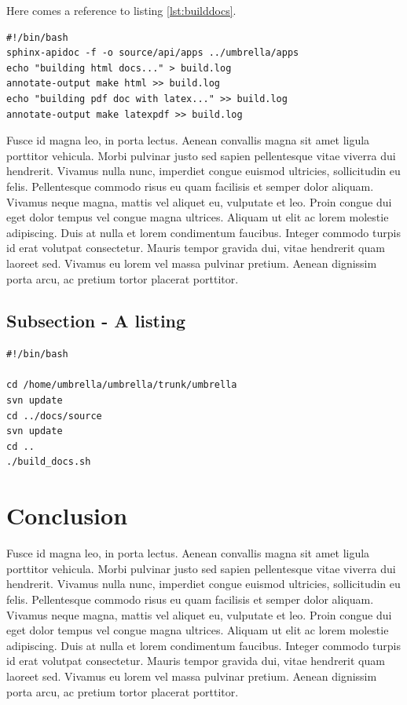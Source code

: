 Here comes a reference to listing \ref{lst:builddocs}.

\lstset{tabsize=2,language=bash}
\begin{lstlisting}[breaklines=true,frame=single,caption={Shellscript for building the software documentation in HTML and PDF},label=lst:builddocs]
#!/bin/bash
sphinx-apidoc -f -o source/api/apps ../umbrella/apps
echo "building html docs..." > build.log
annotate-output make html >> build.log
echo "building pdf doc with latex..." >> build.log
annotate-output make latexpdf >> build.log
\end{lstlisting}

Fusce id magna leo, in porta lectus. Aenean convallis magna sit amet ligula
porttitor vehicula. Morbi pulvinar justo sed sapien pellentesque vitae viverra
dui hendrerit. Vivamus nulla nunc, imperdiet congue euismod ultricies,
sollicitudin eu felis. Pellentesque commodo risus eu quam facilisis et semper
dolor aliquam. Vivamus neque magna, mattis vel aliquet eu, vulputate et leo.
Proin congue dui eget dolor tempus vel congue magna ultrices. Aliquam ut elit
ac lorem molestie adipiscing. Duis at nulla et lorem condimentum faucibus.
Integer commodo turpis id erat volutpat consectetur. Mauris tempor gravida
dui, vitae hendrerit quam laoreet sed. Vivamus eu lorem vel massa pulvinar
pretium. Aenean dignissim porta arcu, ac pretium tortor placerat porttitor. 


\subsection{Subsection - A listing}



\lstset{tabsize=2,language=bash}
\begin{lstlisting}[breaklines=true,frame=single,caption={Shellscript that handles the complete build process of the documentation},label=lst:cron-job]
#!/bin/bash

cd /home/umbrella/umbrella/trunk/umbrella
svn update
cd ../docs/source
svn update
cd ..
./build_docs.sh
\end{lstlisting}




\newpage
\section{Conclusion}
Fusce id magna leo, in porta lectus. Aenean convallis magna sit amet ligula
porttitor vehicula. Morbi pulvinar justo sed sapien pellentesque vitae viverra
dui hendrerit. Vivamus nulla nunc, imperdiet congue euismod ultricies,
sollicitudin eu felis. Pellentesque commodo risus eu quam facilisis et semper
dolor aliquam. Vivamus neque magna, mattis vel aliquet eu, vulputate et leo.
Proin congue dui eget dolor tempus vel congue magna ultrices. Aliquam ut elit
ac lorem molestie adipiscing. Duis at nulla et lorem condimentum faucibus.
Integer commodo turpis id erat volutpat consectetur. Mauris tempor gravida
dui, vitae hendrerit quam laoreet sed. Vivamus eu lorem vel massa pulvinar
pretium. Aenean dignissim porta arcu, ac pretium tortor placerat porttitor. 







